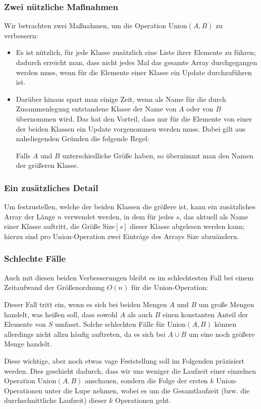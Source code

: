 \documentclass[smaller,xcolor=dvipsnames]{beamer}
\newcommand{\opunion}{\text{Union}}
\begin{document}
\begin{frame}
\frametitle{Zwei nützliche Maßnahmen}
Wir betrachten \alert{zwei Maßnahmen}, um die Operation $\opunion{(A,B)}$ zu verbessern:
\begin{itemize}
\item Es ist nützlich, für jede Klasse zusätzlich eine Liste ihrer Elemente zu führen; dadurch erreicht man, dass nicht jedes Mal das gesamte Array durchgegangen werden muss, wenn für die Elemente einer Klasse ein Update durchzuführen ist.
\item Darüber hinaus spart man einige Zeit, wenn als Name für die durch Zusammenlegung entstandene Klasse der Name von $A$ oder von $B$ übernommen wird. Das hat den Vorteil, dass nur für die Elemente von einer der beiden Klassen ein Update vorgenommen werden muss. Dabei gilt aus naheliegenden Gründen die folgende \alert{Regel}:

\begin{center}
\alert{Falls $A$ und $B$ unterschiedliche Größe haben, so übernimmt man den Namen der größeren Klasse.}
\end{center}
\end{itemize}
\end{frame}

\begin{frame}
\frametitle{Ein zusätzliches Detail}
 Um festzustellen, welche der beiden Klassen die größere ist, kann ein zusätzliches Array  der Länge $n$ verwendet werden, in dem für jedes $s$, das aktuell als Name einer Klasse auftritt, die Größe Size$[s]$ dieser Klasse abgelesen werden kann; hierzu sind pro Union-Operation zwei Einträge des Arrays Size abzuändern.
\end{frame}

\begin{frame}
\frametitle{Schlechte Fälle}
 Auch mit diesen beiden Verbesserungen bleibt es \alert{im schlechtesten Fall} bei einem Zeitaufwand der Größenordnung $O(n)$ für die Union-Operation: \\ \medskip
 
 Dieser Fall tritt ein, wenn es sich bei beiden Mengen $A$ und $B$ um große Mengen handelt, was heißen soll, dass sowohl $A$ als auch $B$ einen konstanten Anteil der Elemente von $S$ umfasst. \alert{Solche schlechten Fälle für $\opunion{(A,B)}$ können allerdings nicht allzu häufig auftreten, da es sich bei $A \cup B$ um eine noch größere Menge handelt}. \\ \medskip
 
 Diese wichtige, aber noch etwas vage Feststellung soll im Folgenden präzisiert werden. Dies geschieht dadurch, dass wir uns weniger die Laufzeit einer einzelnen Operation $\opunion{(A,B)}$ anschauen, sondern die Folge der ersten $k$ Union-Operationen unter die Lupe nehmen, wobei es um die \alert{Gesamtlaufzeit} (bzw. die \alert{durchschnittliche Laufzeit}) dieser $k$ Operationen geht.
\end{frame}
\end{document}
